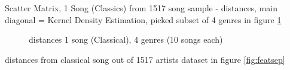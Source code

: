 \noindent Scatter Matrix, 1 Song (Classics) from 1517 song sample - distances, main diagonal = Kernel Density Estimation, picked subset of 4 genres in figure \ref{fig:corr7}
\begin{figure}[htbp]
	\centering
	\caption{distances 1 song (Classical), 4 genres (10 songs each)}
	\label{fig:corr7}
\end{figure}

\noindent distances from classical song out of 1517 artists dataset in figure \ref{fig:featsep}\\

